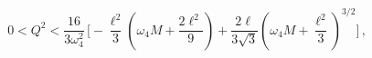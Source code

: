 \begin{equation}
0<Q^2<\frac{16}{3 \omega_4^2}\,\biggl[-\frac{\ell^2}{3}\left(
\omega_4 M+ \frac{2\ell^2}{9}\right)+\frac{2\ell}{3\sqrt{3}}
\left(\omega_4 M+ \frac{\ell^2}{3}\right)^{3/2}\biggr]\,,
\label{k-1}
\end{equation}

